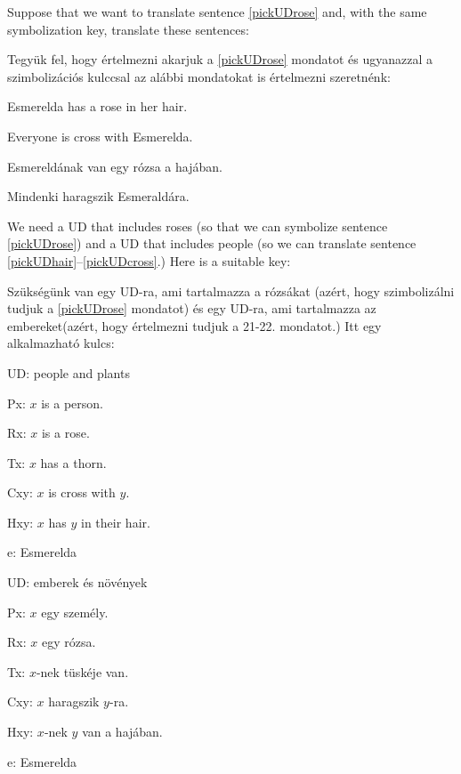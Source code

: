 Suppose that we want to translate sentence \ref{pickUDrose} and, with the same symbolization key, translate these sentences:

Tegyük fel, hogy értelmezni akarjuk a \ref{pickUDrose} mondatot és ugyanazzal a szimbolizációs kulccsal az alábbi mondatokat is értelmezni szeretnénk:

\begin{earg}
\item[\ex{pickUDhair}] Esmerelda has a rose in her hair.
\item[\ex{pickUDcross}] Everyone is cross with Esmerelda.
\end{earg}

\begin{earg}
\item[\ex{pickUDhair}] Esmereldának van egy rózsa a hajában.
\item[\ex{pickUDcross}] Mindenki haragszik Esmeraldára.
\end{earg}

We need a UD that includes roses (so that we can symbolize sentence \ref{pickUDrose}) and a UD that includes people (so we can translate sentence \ref{pickUDhair}--\ref{pickUDcross}.) Here is a suitable key:

Szükségünk van egy UD-ra, ami tartalmazza a rózsákat (azért, hogy szimbolizálni tudjuk a \ref{pickUDrose} mondatot) és egy UD-ra, ami tartalmazza az embereket(azért, hogy értelmezni tudjuk a 21-22. mondatot.) Itt egy alkalmazható kulcs:

\begin{ekey}
\item[UD:] people and plants
\item[Px:] $x$ is a person.
\item[Rx:] $x$ is a rose.
\item[Tx:] $x$ has a thorn.
\item[Cxy:] $x$ is cross with $y$.
\item[Hxy:] $x$ has $y$ in their hair.
\item[e:] Esmerelda
\end{ekey}

\begin{ekey}
\item[UD:] emberek és növények 
\item[Px:] $x$ egy személy.
\item[Rx:] $x$ egy rózsa.
\item[Tx:] $x$-nek tüskéje van.
\item[Cxy:] $x$ haragszik $y$-ra. 
\item[Hxy:] $x$-nek $y$ van a hajában.
\item[e:] Esmerelda 
\end{ekey}

